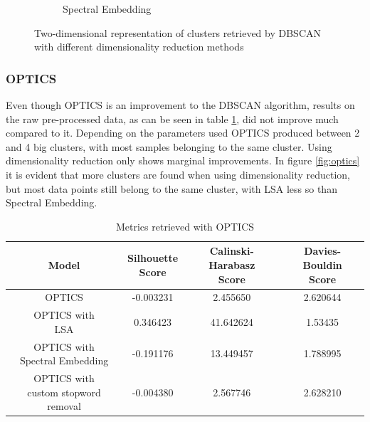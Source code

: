 \begin{figure}
\begin{subfigure}{.3\textwidth}
    \caption{Spectral Embedding}
    \label{fig:dbscan_spectral}
  \end{subfigure}
  \caption{Two-dimensional representation of clusters retrieved by DBSCAN with different dimensionality reduction methods}
  \label{fig:dbscan}
\end{figure}

\subsubsection{OPTICS}

Even though OPTICS is an improvement to the DBSCAN algorithm, results on the raw pre-processed data, as can be seen in table \ref{tab:scores_optics}, did not improve much compared to it. Depending on the parameters used OPTICS produced between 2 and 4 big clusters, with most samples belonging to the same cluster. Using dimensionality reduction only shows marginal improvements. In figure \ref{fig:optics} it is evident that more clusters are found when using dimensionality reduction, but most data points still belong to the same cluster, with LSA less so than Spectral Embedding.

\begin{table}[]
  \centering
  \begin{tabular}{c|c|c|c}
    Model &  \shortstack[c]{Silhouette \\ Score} & \shortstack[c]{Calinski-Harabasz \\ Score} &  \shortstack[c]{Davies-Bouldin \\ Score}  \\
    \hline
    \hline
    OPTICS & -0.003231 & 2.455650 & 2.620644 \\
    \hline
    \shortstack[c]{OPTICS with \\ LSA} & 0.346423 & 41.642624 & 1.53435 \\
    \hline
    \shortstack[c]{OPTICS with \\ Spectral Embedding} & -0.191176 & 13.449457 & 1.788995 \\
    \hline
    \shortstack[c]{OPTICS with \\ custom stopword removal} & -0.004380 & 2.567746 & 2.628210 \\
   \end{tabular}
  \caption{Metrics retrieved with OPTICS}
  \label{tab:scores_optics}
\end{table}

